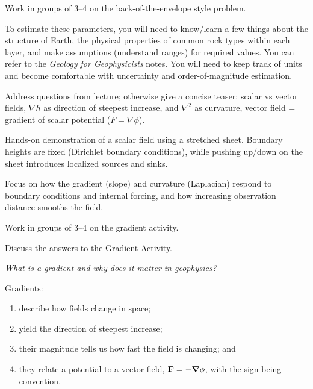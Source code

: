 Work in groups of 3--4 on the back-of-the-envelope style problem.

To estimate these parameters, you will need to know/learn a few things about the structure of Earth, the physical properties of common rock types within each layer, and make assumptions (understand ranges) for required values.  You can refer to the \emph{Geology for Geophysicists} notes.  You will need to keep track of units and become comfortable with uncertainty and order-of-magnitude estimation.


Address questions from lecture; otherwise give a concise teaser: scalar vs vector fields, $\nabla h$ as direction of steepest increase, and $\nabla^2$ as curvature, vector field = gradient of scalar potential ($F = \nabla \phi$).



Hands-on demonstration of a scalar field using a stretched sheet. Boundary heights are fixed (Dirichlet boundary conditions), while pushing up/down on the sheet introduces localized sources and sinks.

Focus on how the gradient (slope) and curvature (Laplacian) respond to boundary conditions and internal forcing, and how increasing observation distance smooths the field.


Work in groups of 3--4 on the gradient activity.


Discuss the answers to the Gradient Activity.


\emph{What is a gradient and why does it matter in geophysics?}

Gradients:
\begin{enumerate} 
  \item describe how fields change in space; 
  \item yield the direction of steepest increase; 
  \item their magnitude tells us how fast the field is changing; and
  \item they relate a potential to a vector field, \( \vb{F} = -\grad{\phi} \), with the sign being convention.
\end{enumerate}

